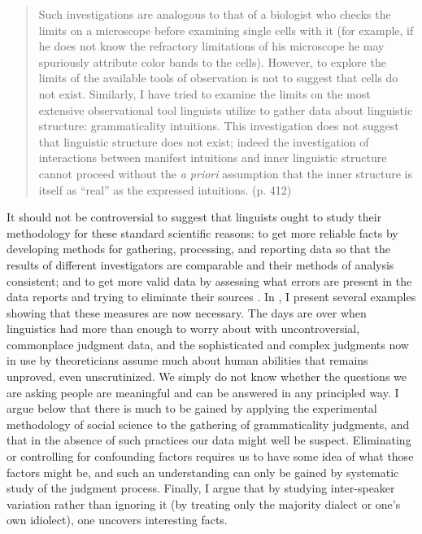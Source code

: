 \begin{quote}
Such investigations are analogous to that of a biologist who checks the limits on a microscope before examining single cells with it (for example, if he does not know the refractory limitations of his microscope he may spuriously attribute color bands to the cells). However, to explore the limits of the available tools of observation is not to suggest that cells do not exist. Similarly, I have tried to examine the limits on the most extensive observational tool linguists utilize to gather
data about linguistic structure: grammaticality intuitions. This investigation does not suggest that linguistic structure does not exist; indeed the investigation of interactions between manifest intuitions and inner linguistic structure cannot proceed without the \textit{a priori} assumption that the inner structure is itself as ``real'' as the expressed intuitions. (p. 412)
\end{quote}


It should not be controversial to suggest that linguists ought to study their methodology for these standard scientific reasons: to get more reliable facts by developing methods for gathering, processing, and reporting data so that the results of different investigators are comparable and their methods of analysis consistent; and to get more valid data by assessing what errors are present in the data reports and trying to eliminate their sources \citep{Labov1978}. In , I present several examples showing that these measures are now necessary. The days are over when linguistics had more than enough to worry about with uncontroversial, commonplace judgment data, and the sophisticated and complex judgments now in use by theoreticians assume much about human abilities that remains unproved, even unscrutinized. We simply do not know whether the questions we are asking people are meaningful and can be answered in any principled way. I argue below that there is much to be gained by applying the experimental methodology of social science to the gathering of grammaticality judgments, and that in the absence of such practices our data might well be suspect. Eliminating or controlling for confounding factors requires us to have some idea of what those factors might be, and such an understanding can only be gained by systematic study of the judgment process. Finally, I argue that by studying inter-speaker variation rather than ignoring it (by treating only the majority dialect or one's own idiolect), one uncovers interesting facts.

